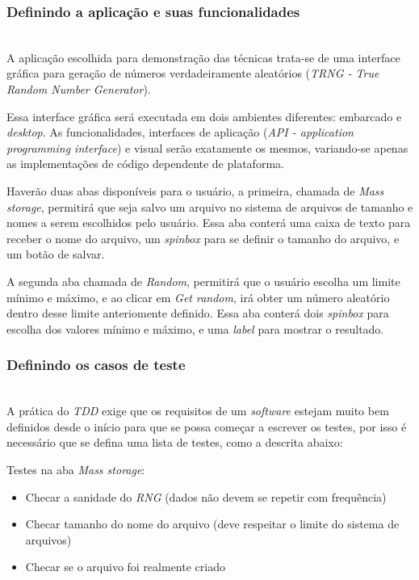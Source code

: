 \documentclass[times, twoside, watermark]{artigo}
\begin{document}
\subsubsection{Definindo a aplicação e suas funcionalidades}\hfill\\

A aplicação escolhida para demonstração das técnicas trata-se de uma interface
gráfica para geração de números verdadeiramente aleatórios (\textit{TRNG - True 
Random Number Generator}).

Essa interface gráfica será executada em dois ambientes diferentes: embarcado e 
\textit{desktop}. As funcionalidades, interfaces de aplicação (\textit{API - 
application programming interface}) e visual serão exatamente os mesmos, variando-se
apenas as implementações de código dependente de plataforma. 

Haverão duas abas disponíveis para o usuário, a primeira, chamada de \textit{Mass 
storage}, permitirá que seja salvo um arquivo no sistema de arquivos de 
tamanho e nomes a serem escolhidos pelo usuário. Essa aba conterá uma caixa de texto 
para receber o nome do arquivo, um \textit{spinbox} para se definir o tamanho do 
arquivo, e um botão de salvar.

A segunda aba chamada de \textit{Random}, permitirá que o usuário escolha um limite
mínimo e máximo, e ao clicar em \textit{Get random}, irá obter um número aleatório
dentro desse limite anteriomente definido. Essa aba conterá dois \textit{spinbox}
para escolha dos valores mínimo e máximo, e uma \textit{label} para mostrar o 
resultado.

\subsubsection{Definindo os casos de teste}\hfill\\

A prática do \textit{TDD} exige que os requisitos de um \textit{software}
estejam muito bem definidos desde o início para que se possa começar a escrever 
os testes, por isso é necessário que se defina uma lista de testes, como a descrita 
abaixo:

Testes na aba \textit{Mass storage}:

\begin{itemize}
\itemsep0em 
\item Checar a sanidade do \textit{RNG} (dados não devem se repetir com frequência)
\item Checar tamanho do nome do arquivo (deve respeitar o limite do sistema de arquivos)
\item Checar se o arquivo foi realmente criado
\end{itemize}
\end{document}
